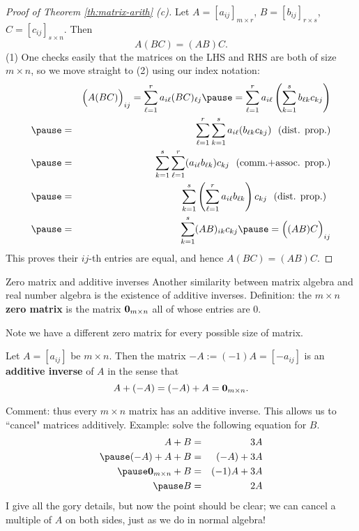 \begin{frame}
\begin{proof}[Proof of Theorem \ref{th:matrix-arith} (c)]
Let $A=[a_{ij}]_{m\times r}$, $B=[b_{ij}]_{r\times s}$, $C=[c_{ij}]_{s\times n}$. Then 
\[
A(BC)=(AB)C.
\]
\bpause
(1) One checks easily that the matrices on the LHS and RHS are both of size $m\times n$, so we move straight to (2) using our index notation:
 \scriptsize
\pause \begin{eqnarray*}
& &\Bigl(A(BC)\Bigr)_{ij}=\sum_{\ell=1}^ra_{i\ell}(BC)_{\ell j}
\pause=\sum_{\ell=1}^ra_{i\ell}\left(\sum_{k=1}^sb_{\ell k}c_{kj}\right)\\
\pause&=&\sum_{\ell=1}^r\sum_{k=1}^sa_{i\ell}(b_{\ell k}c_{kj}) \ \text{ (dist. prop.)}\\
\pause&=&\sum_{k=1}^s\sum_{\ell=1}^r(a_{i\ell}b_{\ell k})c_{kj} \ \text{ (comm.+assoc. prop.)}\\
\pause&=&\sum_{k=1}^s\left(\sum_{\ell=1}^ra_{i\ell}b_{\ell k}\right)c_{kj} \ \text{ (dist. prop.) }\\
\pause&=&\sum_{k=1}^s(AB)_{ik}c_{kj}
\pause=\Bigl((AB)C\Bigr)_{ij}
\end{eqnarray*}
\pause This proves their $ij$-th entries are equal, and hence $A(BC)=(AB)C$. 
\end{proof}
\end{frame}
\begin{frame}{Zero matrix and additive inverses}
Another similarity between matrix algebra and real number algebra is the existence of \alert{additive inverses}.
\bpause
\alert{Definition:} the {\bf $m\times n$ zero matrix} is the matrix ${\mathbf 0}_{m\times n}$ all of whose entries are 0. 

Note we have a different zero matrix for every possible size of matrix. 
\pause
\begin{theorem}
Let $A=[a_{ij}]$ be $m\times n$. Then the matrix $-A:=(-1)A=[-a_{ij}]$ is an {\bf additive inverse} of $A$ in the sense that 
\[
A+(-A)=(-A)+A={\mathbf 0}_{m\times n}.
\]
\end{theorem}
\pause
\alert{Comment:}
thus every $m\times n$ matrix has an additive inverse. This allows us to ``cancel" matrices \alert{additively}. Example: solve the following equation for $B$.  
\begin{eqnarray*}
A+B&=&3A\\
\pause (-A)+A+B&=&(-A)+3A\\
\pause \boldzero_{m\times n}+B&=&(-1)A+3A\\
\pause B&=&2A
\end{eqnarray*} 
I give all the gory details, but now the point should be clear; we can cancel a multiple of $A$ on both sides, just as we do in normal algebra!  
\end{frame}
